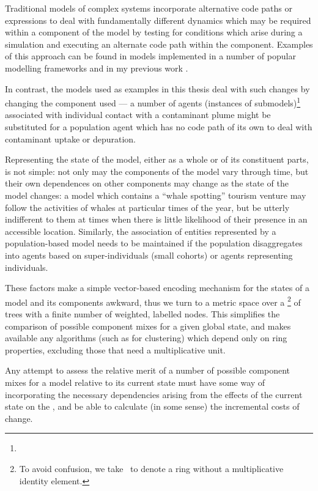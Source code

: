Traditional models of complex systems incorporate alternative code
paths or expressions to deal with fundamentally different dynamics
which may be required within a component of the model by testing for
conditions which arise during a simulation and executing an alternate
code path within the component. Examples of this approach can be found
in models implemented in a number of popular modelling frameworks
\citep{netlogo,swarm,repast,mason} and in my previous work
\citep{nws,ningaloo}.

In contrast, the models used as examples in this thesis deal with such
changes by changing the component used --- a number of agents
(instances of submodels)\footnote{} associated with individual contact
with a contaminant plume might be substituted for a population agent
which has no code path of its own to deal with contaminant uptake or
depuration.

Representing the state of the model, either as a whole or of its
constituent parts, is not simple: not only may the components of the
model vary through time, but their own dependences on other components
may change as the state of the model changes: a model which contains a
``whale spotting'' tourism venture may follow the activities of whales
at particular times of the year, but be utterly indifferent to them at
times when there is little likelihood of their presence in an
accessible location. Similarly, the association of entities
represented by a population-based model needs to be maintained if the
population dis\-aggregates into agents based on super-individuals
(small cohorts) or agents representing individuals.

These factors make a simple vector-based encoding mechanism for the
states of a model and its components awkward, thus we turn to a metric
space over a \rng\footnote{To avoid confusion, we take \rng\ to denote
  a ring without a multiplicative identity element.} of trees with a
finite number of weighted, labelled nodes. This simplifies the
comparison of possible component mixes for a given global state, and
makes available any algorithms (such as for clustering) which depend
only on ring properties, excluding those that need a multiplicative
unit.

Any attempt to assess the relative merit of a number of possible
component mixes for a model relative to its current state must have
some way of incorporating the necessary dependencies arising from the
effects of the current state on the , and be able to calculate (in
some sense) the incremental costs of change.


